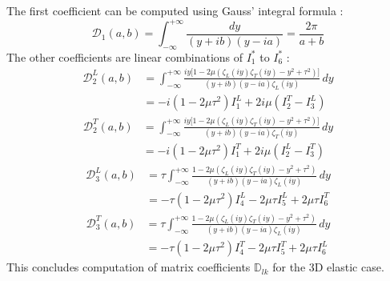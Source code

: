 The first coefficient can be computed using Gauss' integral formula :
\begin{equation}
\mathcal{D}_1(a,b)=\int_{-\infty}^{+\infty} \frac{dy}{(y+ib)(y-ia)}=\frac{2\pi}{a+b}
\end{equation}
The other coefficients are linear combinations of $I_1^*$ to $I_6^*$ :
\begin{equation}
\begin{split}
\mathcal{D}_2^L(a,b)&=\int_{-\infty}^{+\infty} \frac{iy\lbrack 1-2\mu (\zeta_L(iy) \zeta_T(iy)- y^2+\tau^2)\rbrack}{(y+ib)(y-ia)\zeta_L(iy)} \,dy \\
&=-i(1-2\mu\tau^2)I_1^L+2i\mu(I_2^T-I_3^L)
\end{split}
\end{equation}
\begin{equation}
\begin{split}
\mathcal{D}_2^T(a,b)&=\int_{-\infty}^{+\infty} \frac{iy\lbrack 1-2\mu (\zeta_L(iy) \zeta_T(iy)- y^2+\tau^2)\rbrack}{(y+ib)(y-ia)\zeta_T(iy)} \,dy \\
&=-i(1-2\mu\tau^2)I_1^T+2i\mu(I_2^L-I_3^T)
\end{split}
\end{equation}
\begin{equation}
\begin{split}
\mathcal{D}_3^L(a,b)&=\tau\int_{-\infty}^{+\infty} \frac{1-2\mu(\zeta_L(iy)\zeta_T(iy)-y^2+\tau^2)}{(y+ib)(y-ia)\zeta_L(iy)}\,dy \\
&=-\tau(1-2\mu\tau^2)I_4^L-2\mu\tau I_5^L+2\mu\tau I_6^T
\end{split}
\end{equation}
\begin{equation}
\begin{split}
\mathcal{D}_3^T(a,b)&=\tau\int_{-\infty}^{+\infty} \frac{1-2\mu(\zeta_L(iy)\zeta_T(iy)-y^2+\tau^2)}{(y+ib)(y-ia)\zeta_L(iy)}\,dy \\
&=-\tau(1-2\mu\tau^2)I_4^T-2\mu\tau I_5^T+2\mu\tau I_6^L
\end{split}
\end{equation}
This concludes computation of matrix coefficients $\mathbb{D}_{lk}$ for the 3D elastic case.